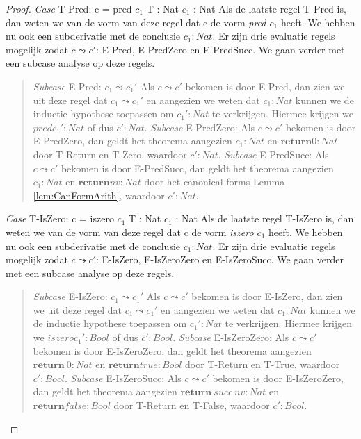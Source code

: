 \begin{proof}
    \indent \textit{Case} T-Pred: c = pred $c_1$ \quad T : Nat \quad $c_1$ : Nat \newline
    Als de laatste regel T-Pred is, dan weten we van de vorm van deze regel dat c de vorm \emph{pred $c_1$} heeft. We hebben nu ook een subderivatie met de conclusie  $c_1 : Nat$. Er zijn drie evaluatie regels mogelijk zodat $c \leadsto c'$: E-Pred, E-PredZero en E-PredSucc. We gaan verder met een subcase analyse op deze regels.
    \begin{quote}
        \textit{Subcase} E-Pred: $c_1 \leadsto c_1'$ \newline
        Als $c \leadsto c'$ bekomen is door E-Pred, dan zien we uit deze regel dat $c_1 \leadsto c_1'$ en aangezien we weten dat $c_1 : Nat$ kunnen we de inductie hypothese toepassen om $c_1' : Nat$ te verkrijgen. Hiermee krijgen we $pred c_1' : Nat$ of dus $c' : Nat$. \newline 
        \textit{Subcase} E-PredZero: \newline
        Als $c \leadsto c'$ bekomen is door E-PredZero, dan geldt het theorema aangezien $c_1 : Nat$ en $\textbf{return} 0 : Nat$ door T-Return en T-Zero, waardoor $c' : Nat$.
        \textit{Subcase} E-PredSucc: \newline
        Als $c \leadsto c'$ bekomen is door E-PredSucc, dan geldt het theorema aangezien $c_1 : Nat$ en $\textbf{return} nv : Nat$ door het canonical forms Lemma \ref{lem:CanFormArith}, waardoor $c' : Nat$.
    \end{quote}
    \indent \textit{Case} T-IsZero: c = iszero $c_1$ \quad T : Nat \quad $c_1$ : Nat \newline
    Als de laatste regel T-IsZero is, dan weten we van de vorm van deze regel dat c de vorm \emph{iszero $c_1$} heeft. We hebben nu ook een subderivatie met de conclusie  $c_1 : Nat$. Er zijn drie evaluatie regels mogelijk zodat $c \leadsto c'$: E-IsZero, E-IsZeroZero en E-IsZeroSucc. We gaan verder met een subcase analyse op deze regels.
    \begin{quote}
        \textit{Subcase} E-IsZero: $c_1 \leadsto c_1'$ \newline
        Als $c \leadsto c'$ bekomen is door E-IsZero, dan zien we uit deze regel dat $c_1 \leadsto c_1'$ en aangezien we weten dat $c_1 : Nat$ kunnen we de inductie hypothese toepassen om $c_1' : Nat$ te verkrijgen. Hiermee krijgen we $iszero c_1' : Bool$ of dus $c' : Bool$. \newline 
        \textit{Subcase} E-IsZeroZero: \newline
        Als $c \leadsto c'$ bekomen is door E-IsZeroZero, dan geldt het theorema aangezien $\textbf{return} \  0 : Nat$ en $\textbf{return} true : Bool$ door T-Return en T-True, waardoor $c' : Bool$.
        \textit{Subcase} E-IsZeroSucc: \newline
        Als $c \leadsto c'$ bekomen is door E-IsZeroZero, dan geldt het theorema aangezien $\textbf{return} \  succ \  nv : Nat$ en $\textbf{return} false : Bool$ door T-Return en T-False, waardoor $c' : Bool$.
    \end{quote}
\end{proof}


